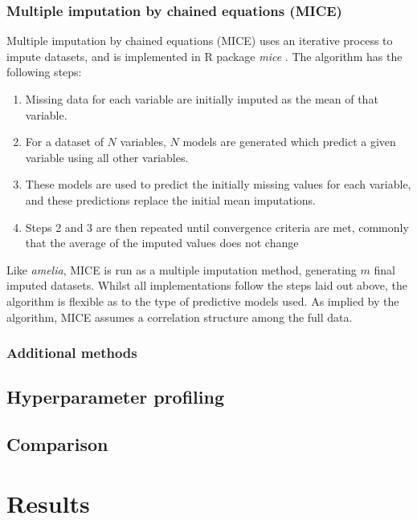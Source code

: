 \documentclass[onecolumn]{article}
\begin{document}
\subsubsection{Multiple imputation by chained equations (MICE)}

Multiple imputation by chained equations (MICE) uses an iterative process to impute datasets, and is implemented in R package \textit{mice} \citep{Buuren2011}. The algorithm has the following steps:
\begin{enumerate}
\item Missing data for each variable are initially imputed as the mean of that variable.
\item For a dataset of $N$ variables, $N$ models are generated which predict a given variable using all other variables.
\item These models are used to predict the initially missing values for each variable, and these predictions replace the initial mean imputations.
\item Steps 2 and 3 are then repeated until convergence criteria are met, commonly that the average of the imputed values does not change
\end{enumerate}

Like \textit{amelia}, MICE is run as a multiple imputation method, generating $m$ final imputed datasets. Whilst all implementations follow the steps laid out above, the algorithm is flexible as to the type of predictive models used. As implied by the algorithm, MICE assumes a correlation structure among the full data.

\subsubsection{Additional methods}


\subsection{Hyperparameter profiling}


\subsection{Comparison}


\section{Results}


\begin{multicols}{2}

{\small
}

\end{multicols}
\end{document}
